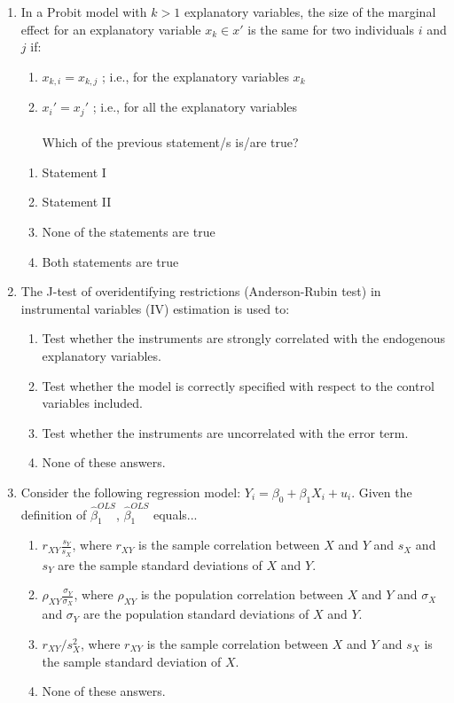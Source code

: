 \documentclass{article}
\begin{document}
\begin{enumerate}
    \item In a Probit model with $k>1$ explanatory variables, the size of the marginal effect  for an explanatory variable $x_k\in x'$ is the same for two individuals $i$ and $j$ if:
\begin{enumerate}
    \item[I.] $x_{k,i}=x_{k,j}$ ; i.e., for the explanatory variables $x_k$
    \item[II.] $x_i'=x_j'$ ; i.e., for all the explanatory variables\\\\
    Which of the previous statement/s is/are true? 
    \end{enumerate}
\begin{enumerate}[label=(\alph*)]
        \item Statement I
        \item Statement II
        \item None of the statements are true
        \item Both statements are true
\end{enumerate}\vspace{.25cm}


    \item The J-test of overidentifying restrictions (Anderson-Rubin test)  in instrumental variables (IV) estimation is used to:
    \begin{enumerate}[label=\alph*)]
        \item Test whether the instruments are strongly correlated with the endogenous explanatory variables.
        \item Test whether the model is correctly specified with respect to the control variables included.
        \item Test whether the instruments are uncorrelated with the error term.
        \item None of these answers.
    \end{enumerate}\vspace{.25cm}


    \item Consider the following regression model: $Y_i = \beta_0 + \beta_1 X_i + u_i$. Given the definition of $\hat{\beta}^{OLS}_1$,  $\hat{\beta}^{OLS}_1$ equals...
    \begin{enumerate}[label=\alph*)]
        \item $r_{XY}\frac{s_Y}{s_X}$, where $r_{XY}$ is the sample correlation between $X$ and $Y$ and ${s_X}$ and ${s_Y}$ are the sample standard deviations of $X$ and $Y$. 
        \item $\rho_{XY}\frac{\sigma_Y}{\sigma_X}$, where $\rho_{XY}$ is the population correlation between $X$ and $Y$ and ${\sigma_X}$ and ${\sigma_Y}$ are the population standard deviations of $X$ and $Y$. 
        \item $r_{XY}/{s_X^2}$, where $r_{XY}$ is the sample correlation between $X$ and $Y$ and ${s_X}$ is the sample standard deviation of $X$. 
        \item None of these answers. 
    \end{enumerate}\vspace{.25cm}


\end{enumerate}
\end{document}
